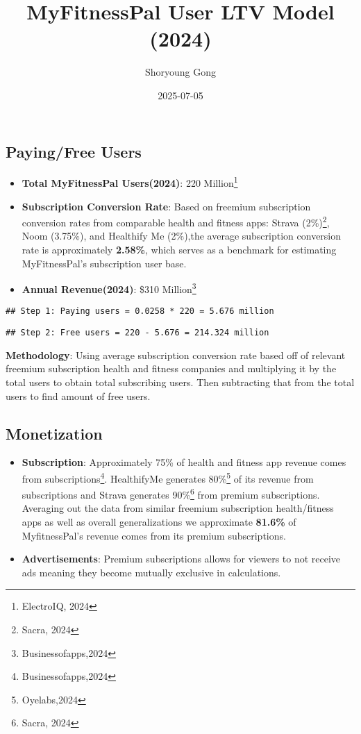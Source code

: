 \documentclass[
]{article}
\title{MyFitnessPal User LTV Model (2024)}
\author{Shoryoung Gong}
\date{2025-07-05}
\providecommand{\tightlist}{%
  \setlength{\itemsep}{0pt}\setlength{\parskip}{0pt}}
\begin{document}
\maketitle

\subsection{Paying/Free Users}\label{payingfree-users}

\begin{itemize}
\tightlist
\item
  \textbf{Total MyFitnessPal Users(2024)}: 220 Million\footnote{ElectroIQ,
    2024}
\item
  \textbf{Subscription Conversion Rate}: Based on freemium subscription
  conversion rates from comparable health and fitness apps: Strava
  (2\%)\footnote{Sacra, 2024}, Noom (3.75\%), and Healthify Me (2\%),the
  average subscription conversion rate is approximately \textbf{2.58\%},
  which serves as a benchmark for estimating MyFitnessPal's subscription
  user base.
\item
  \textbf{Annual Revenue(2024)}: \$310 Million\footnote{Businessofapps,2024}
\end{itemize}

\begin{verbatim}
## Step 1: Paying users = 0.0258 * 220 = 5.676 million
\end{verbatim}

\begin{verbatim}
## Step 2: Free users = 220 - 5.676 = 214.324 million
\end{verbatim}

\textbf{Methodology}: Using average subscription conversion rate based
off of relevant freemium subscription health and fitness companies and
multiplying it by the total users to obtain total subscribing users.
Then subtracting that from the total users to find amount of free users.

\subsection{Monetization}\label{monetization}

\begin{itemize}
\tightlist
\item
  \textbf{Subscription}: Approximately 75\% of health and fitness app
  revenue comes from subscriptions\footnote{Businessofapps,2024}.
  HealthifyMe generates 80\%\footnote{Oyelabs,2024} of its revenue from
  subscriptions and Strava generates 90\%\footnote{Sacra, 2024} from
  premium subscriptions. Averaging out the data from similar freemium
  subscription health/fitness apps as well as overall generalizations we
  approximate \textbf{81.6\%} of MyfitnessPal's revenue comes from its
  premium subscriptions.
\item
  \textbf{Advertisements}: Premium subscriptions allows for viewers to
  not receive ads meaning they become mutually exclusive in
  calculations.
\end{itemize}
\end{document}
